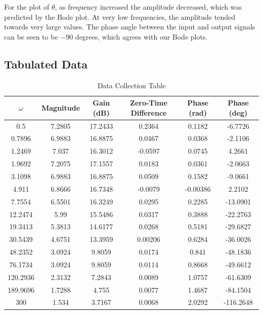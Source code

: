 For the plot of $\theta$, as frequency increased the amplitude decreased, which was predicted by the Bode plot. At very low frequencies, the amplitude tended towards very large values. The phase angle between the input and output signals can be seen to be $-90$ degrees, which agrees with our Bode plots.  

\subsection{Tabulated Data}

\begin{table}[H]
	\centering
	\caption{Data Collection Table}
	\label{tab:data-collection}
	\begin{tabular}{|| c c c c c c ||}
		\hline
		$\omega$ & Magnitude & Gain (dB) & Zero-Time Difference & Phase (rad) & Phase (deg) \\ [0.5ex]
		\hline\hline
		0.5 & 7.2805 & 17.2433 & 0.2364 & 0.1182 & -6.7726 \\
		\hline
		0.7896 & 6.9883 & 16.8875 & 0.0467 & 0.0368 & -2.1106 \\
		\hline 
		1.2469 & 7.037 & 16.3012 & -0.0597 & 0.0745 & 4.2661 \\
		\hline 
		1.9692 & 7.2075 & 17.1557 & 0.0183 & 0.0361 & -2.0663 \\
		\hline
		3.1098 & 6.9883 & 16.8875 & 0.0509 & 0.1582 & -9.0661 \\
		\hline
		4.911 & 6.8666 & 16.7348 & -0.0079 & -0.00386 & 2.2102 \\
		\hline 
		7.7554 & 6.5501 & 16.3249 & 0.0295 & 0.2285 & -13.0901 \\
		\hline 
		12.2474 & 5.99 & 15.5486 & 0.0317 & 0.3888 & -22.2763 \\
		\hline 
		19.3413 & 5.3813 & 14.6177 & 0.0268 & 0.5181 & -29.6827 \\
		\hline 
		30.5439 & 4.6751 & 13.3959 & 0.00206 & 0.6284 & -36.0026 \\
		\hline 
		48.2352 & 3.0924 & 9.8059 & 0.0174 & 0.841 & -48.1836 \\
		\hline 
		76.1734 & 3.0924 & 9.8059 & 0.0114 & 0.8668 & -49.6612 \\
		\hline 
		120.2936 & 2.3132 & 7.2843 & 0.0089 & 1.0757 & -61.6309 \\
		\hline 
		189.9696 & 1.7288 & 4.755 & 0.0077 & 1.4687 & -84.1504 \\
		\hline 
		300 & 1.534 & 3.7167 & 0.0068 & 2.0292 & -116.2648 \\
		\hline 
	\end{tabular}
\end{table}

